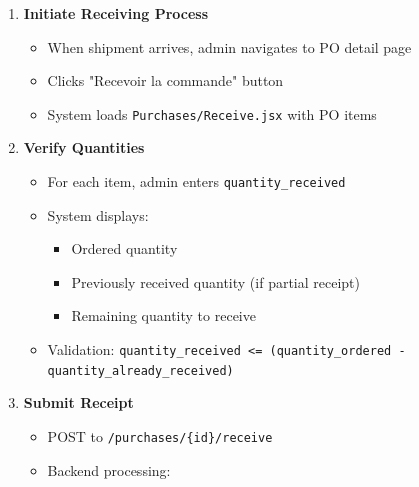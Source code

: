 \begin{enumerate}[leftmargin=*]
    \item \textbf{Initiate Receiving Process}
    \begin{itemize}
        \item When shipment arrives, admin navigates to PO detail page
        \item Clicks "Recevoir la commande" button
        \item System loads \texttt{Purchases/Receive.jsx} with PO items
    \end{itemize}
    
    \item \textbf{Verify Quantities}
    \begin{itemize}
        \item For each item, admin enters \texttt{quantity\_received}
        \item System displays:
        \begin{itemize}
            \item Ordered quantity
            \item Previously received quantity (if partial receipt)
            \item Remaining quantity to receive
        \end{itemize}
        \item Validation: \texttt{quantity\_received <= (quantity\_ordered - quantity\_already\_received)}
    \end{itemize}
    
    \item \textbf{Submit Receipt}
    \begin{itemize}
        \item POST to \texttt{/purchases/\{id\}/receive}
        \item Backend processing:
    \end{itemize}
\end{enumerate}

